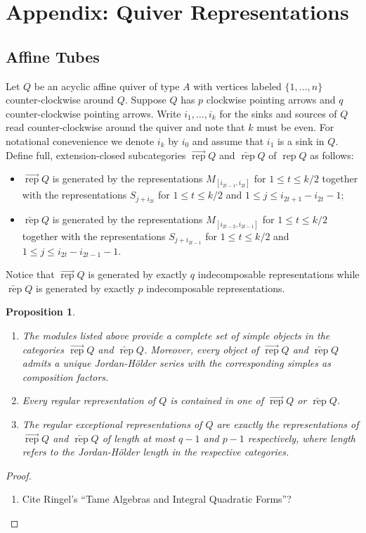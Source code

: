\documentclass[11pt]{amsart}
\newcommand{\rep}{\operatorname{rep}}
\newtheorem{proposition}[theorem]{Proposition}
\begin{document}
\section{Appendix: Quiver Representations}
\subsection{Affine Tubes}
  Let $Q$ be an acyclic affine quiver of type $A$ with vertices labeled $\{1,\ldots,n\}$ counter-clockwise around $Q$.  Suppose $Q$ has $p$ clockwise pointing arrows and $q$ counter-clockwise pointing arrows.  Write $i_1,\ldots,i_k$ for the sinks and sources of $Q$ read counter-clockwise around the quiver and note that $k$ must be even.  For notational conevenience we denote $i_k$ by $i_0$ and assume that $i_1$ is a sink in $Q$.  Define full, extension-closed subcategories $\overrightarrow{\rep}Q$ and $\overleftarrow{\rep}Q$ of $\rep Q$ as follows:
  \begin{itemize}
    \item $\overrightarrow{\rep}Q$ is generated by the representations $M_{[i_{2t-1},i_{2t}]}$ for $1\le t\le k/2$ together with the representations $S_{j+i_{2t}}$ for $1\le t\le k/2$ and $1\le j\le i_{2t+1}-i_{2t}-1$;
    \item $\overleftarrow{\rep}Q$ is generated by the representations $M_{[i_{2t-2},i_{2t-1}]}$ for $1\le t\le k/2$ together with the representations $S_{j+i_{2t-1}}$ for $1\le t\le k/2$ and $1\le j\le i_{2t}-i_{2t-1}-1$.
  \end{itemize}
  Notice that $\overrightarrow{\rep}Q$ is generated by exactly $q$ indecomposable representations while $\overleftarrow{\rep}Q$ is generated by exactly $p$ indecomposable representations.
  \begin{proposition}\mbox{}
    \begin{enumerate}
      \item The modules listed above provide a complete set of simple objects in the categories $\overrightarrow{\rep}Q$ and $\overleftarrow{\rep}Q$.  Moreover, every object of $\overrightarrow{\rep}Q$ and $\overleftarrow{\rep}Q$ admits a unique Jordan-H\"older series with the corresponding simples as composition factors.
      \item Every regular representation of $Q$ is contained in one of $\overrightarrow{\rep}Q$ or $\overleftarrow{\rep}Q$.
      \item The regular exceptional representations of $Q$ are exactly the representations of $\overrightarrow{\rep}Q$ and $\overleftarrow{\rep}Q$ of length at most $q-1$ and $p-1$ respectively, where length refers to the Jordan-H\"older length in the respective categories.
    \end{enumerate}
  \end{proposition}
  \begin{proof}
    \begin{enumerate}
      \item Cite Ringel's ``Tame Algebras and Integral Quadratic Forms''?
    \end{enumerate}
  \end{proof}
\end{document}
